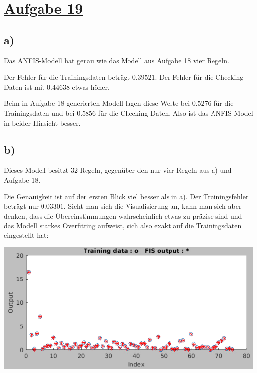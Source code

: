 \section*{\underline{Aufgabe 19}}

\subsection*{a)}

Das ANFIS-Modell hat genau wie das Modell aus Aufgabe 18 vier Regeln.

\hfill


Der Fehler für die Trainingsdaten beträgt $0.39521$. Der Fehler für die Checking-Daten ist mit $0.44638$ etwas höher.

Beim in Aufgabe 18 generierten Modell lagen diese Werte bei $0.5276$ für die Trainingsdaten und bei $0.5856$ für die Checking-Daten.
Also ist das ANFIS Model in beider Hinsicht besser.

\subsection*{b)}

Dieses Modell besitzt 32 Regeln, gegenüber den nur vier Regeln aus a) und Aufgabe 18.

\hfill


Die Genauigkeit ist auf den ersten Blick viel besser als in a). Der Trainingsfehler beträgt nur $0.03301$. Sieht man sich die Visualisierung an, kann man sich aber denken, dass die Übereinstimmungen wahrscheinlich etwas zu präzise sind und das Modell starkes Overfitting aufweist, sich also exakt auf die Trainingsdaten eingestellt hat:

\hfill

\includegraphics[width=\textwidth]{part/grid_train.png}


